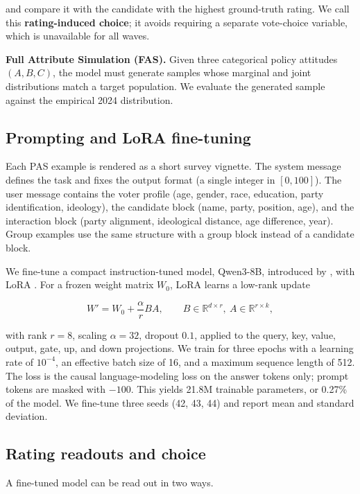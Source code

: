 and compare it with the candidate with the highest ground-truth rating.
We call this \textbf{rating-induced choice}; it avoids requiring a
separate vote-choice variable, which is unavailable for all waves.

\textbf{Full Attribute Simulation (FAS).} Given three categorical policy
attitudes \((A,B,C)\), the model must generate samples whose marginal
and joint distributions match a target population. We evaluate the
generated sample against the empirical 2024 distribution.

\subsection{Prompting and LoRA
fine-tuning}\label{prompting-and-lora-fine-tuning}

Each PAS example is rendered as a short survey vignette. The system
message defines the task and fixes the output format (a single integer
in \([0,100]\)). The user message contains the voter profile (age,
gender, race, education, party identification, ideology), the candidate
block (name, party, position, age), and the interaction block (party
alignment, ideological distance, age difference, year). Group examples
use the same structure with a group block instead of a candidate block.

We fine-tune a compact instruction-tuned model, Qwen3-8B, introduced by
\citet{yang2025qwen3}, with LoRA \citep{hu2022lora}. For a frozen weight
matrix \(W_0\), LoRA learns a low-rank update

\[
W' = W_0 + \frac{\alpha}{r}BA,
\qquad B\in\mathbb{R}^{d\times r},\ A\in\mathbb{R}^{r\times k},
\]

with rank \(r=8\), scaling \(\alpha=32\), dropout \(0.1\), applied to
the query, key, value, output, gate, up, and down projections. We train
for three epochs with a learning rate of \(10^{-4}\), an effective batch
size of 16, and a maximum sequence length of 512. The loss is the causal
language-modeling loss on the answer tokens only; prompt tokens are
masked with \(-100\). This yields 21.8M trainable parameters, or 0.27\%
of the model. We fine-tune three seeds (42, 43, 44) and report mean and
standard deviation.

\subsection{Rating readouts and
choice}\label{rating-readouts-and-choice}

A fine-tuned model can be read out in two ways.

